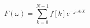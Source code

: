 \documentclass[../main.tex]{subfiles}%
\begin{document}
%
    \Xequation%
    \begin{equation}%
        F(\omega) = \sum_{k=0}^{N-1} f[k] e^{-j \omega k X}%
        \label{eq:fourier-discrete}%
    \end{equation}%
\end{document}
